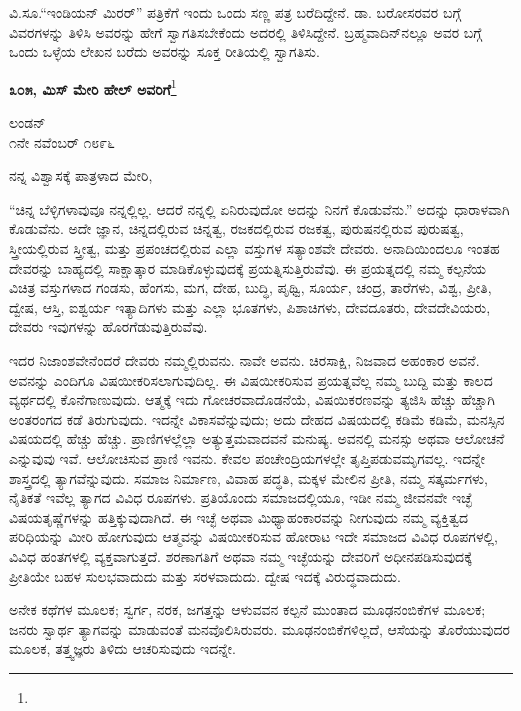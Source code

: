 ವಿ.ಸೂ.\enginline{-}“ಇಂಡಿಯನ್ ಮಿರರ್” ಪತ್ರಿಕೆಗೆ ಇಂದು ಒಂದು ಸಣ್ಣ ಪತ್ರ ಬರೆದಿದ್ದೇನೆ. ಡಾ. ಬರೋಸರವರ ಬಗ್ಗೆ ವಿವರಗಳನ್ನು ತಿಳಿಸಿ ಅವರನ್ನು ಹೇಗೆ ಸ್ವಾಗತಿಸಬೇಕೆಂದು ಅದರಲ್ಲಿ ತಿಳಿಸಿದ್ದೇನೆ. ಬ್ರಹ್ಮವಾದಿನ್‌ನಲ್ಲೂ ಅವರ ಬಗ್ಗೆ ಒಂದು ಒಳ್ಳೆಯ ಲೇಖನ ಬರೆದು ಅವರನ್ನು ಸೂಕ್ತ ರೀತಿಯಲ್ಲಿ ಸ್ವಾಗತಿಸು.

\begin{center}
\textbf{೩೦೫, ಮಿಸ್ ಮೇರಿ ಹೇಲ್‌ ಅವರಿಗೆ}\footnote{}
\end{center}

\begin{flushright}
ಲಂಡನ್\\೧ನೇ ನವೆಂಬರ್ ೧೮೯೬
\end{flushright}

\noindent
ನನ್ನ ವಿಶ್ವಾಸಕ್ಕೆ ಪಾತ್ರಳಾದ ಮೇರಿ,

“ಚಿನ್ನ ಬೆಳ್ಳಿಗಳಾವುವೂ ನನ್ನಲ್ಲಿಲ್ಲ. ಆದರೆ ನನ್ನಲ್ಲಿ ಏನಿರುವುದೋ ಅದನ್ನು ನಿನಗೆ ಕೊಡುವೆನು.” ಅದನ್ನು ಧಾರಾಳವಾಗಿ ಕೊಡುವೆನು. ಅದೇ ಜ್ಞಾನ, ಚಿನ್ನದಲ್ಲಿರುವ ಚಿನ್ನತ್ವ, ರಜಕದಲ್ಲಿರುವ ರಜಕತ್ವ, ಪುರುಷನಲ್ಲಿರುವ ಪುರುಷತ್ವ, ಸ್ತ್ರೀಯಲ್ಲಿರುವ ಸ್ತ್ರೀತ್ವ, ಮತ್ತು ಪ್ರಪಂಚದಲ್ಲಿರುವ ಎಲ್ಲಾ ವಸ್ತುಗಳ ಸತ್ಯಾಂಶವೇ ದೇವರು. ಅನಾದಿಯಿಂದಲೂ ಇಂತಹ ದೇವರನ್ನು ಬಾಹ್ಯದಲ್ಲಿ ಸಾಕ್ಷಾತ್ಕಾರ ಮಾಡಿಕೊಳ್ಳುವುದಕ್ಕೆ ಪ್ರಯತ್ನಿಸುತ್ತಿರುವೆವು. ಈ ಪ್ರಯತ್ನದಲ್ಲಿ ನಮ್ಮ ಕಲ್ಪನೆಯ ವಿಚಿತ್ರ ವಸ್ತುಗಳಾದ ಗಂಡಸು, ಹೆಂಗಸು, ಮಗ, ದೇಹ, ಬುದ್ಧಿ, ಪೃಥ್ವಿ, ಸೂರ್ಯ, ಚಂದ್ರ, ತಾರೆಗಳು, ವಿಶ್ವ, ಪ್ರೀತಿ, ದ್ವೇಷ, ಆಸ್ತಿ, ಐಶ್ವರ್ಯ ಇತ್ಯಾದಿಗಳು ಮತ್ತು ಎಲ್ಲಾ ಭೂತಗಳು, ಪಿಶಾಚಿಗಳು, ದೇವದೂತರು, ದೇವದೇವಿಯರು, ದೇವರು ಇವುಗಳನ್ನು ಹೊರಗೆಡುವುತ್ತಿರುವೆವು.

ಇದರ ನಿಜಾಂಶವೇನೆಂದರೆ ದೇವರು ನಮ್ಮಲ್ಲಿರುವನು. ನಾವೇ ಅವನು. ಚಿರಸಾಕ್ಷಿ, ನಿಜವಾದ ಅಹಂಕಾರ ಅವನೆ. ಅವನನ್ನು ಎಂದಿಗೂ ವಿಷಯೀಕರಿಸಲಾಗುವುದಿಲ್ಲ. ಈ ವಿಷಯೀಕರಿಸುವ ಪ್ರಯತ್ನವೆಲ್ಲ ನಮ್ಮ ಬುದ್ದಿ ಮತ್ತು ಕಾಲದ ವ್ಯರ್ಥದಲ್ಲಿ ಕೊನೆಗಾಣುವುದು. ಆತ್ಮಕ್ಕೆ ಇದು ಗೋಚರವಾದೊಡನೆಯೆ, ವಿಷಯಿಕರಣವನ್ನು ತ್ಯಜಿಸಿ ಹೆಚ್ಚು ಹೆಚ್ಚಾಗಿ ಅಂತರಂಗದ ಕಡೆ ತಿರುಗುವುದು. ಇದನ್ನೇ ವಿಕಾಸವೆನ್ನುವುದು; ಅದು ದೇಹದ ವಿಷಯದಲ್ಲಿ ಕಡಿಮೆ ಕಡಿಮೆ, ಮನಸ್ಸಿನ ವಿಷಯದಲ್ಲಿ ಹೆಚ್ಚು ಹೆಚ್ಚು. ಪ್ರಾಣಿಗಳಲ್ಲೆಲ್ಲಾ ಅತ್ಯುತ್ತಮವಾದವನೆ ಮನುಷ್ಯ. ಅವನಲ್ಲಿ ಮನಸ್ಸು ಅಥವಾ ಆಲೋಚನೆ ಎನ್ನುವುವು ಇವೆ. ಆಲೋಚಿಸುವ ಪ್ರಾಣಿ ಇವನು. ಕೇವಲ ಪಂಚೇಂದ್ರಿಯಗಳಲ್ಲೇ ತೃಪ್ತಿಪಡುವಮೃಗವಲ್ಲ. ಇದನ್ನೇ ಶಾಸ್ತ್ರದಲ್ಲಿ ತ್ಯಾಗವೆನ್ನುವುದು. ಸಮಾಜ ನಿರ್ಮಾಣ, ವಿವಾಹ ಪದ್ಧತಿ, ಮಕ್ಕಳ ಮೇಲಿನ ಪ್ರೀತಿ, ನಮ್ಮ ಸತ್ಕರ್ಮಗಳು, ನೈತಿಕತೆ \enginline{-} ಇವೆಲ್ಲ ತ್ಯಾಗದ ವಿವಿಧ ರೂಪಗಳು. ಪ್ರತಿಯೊಂದು ಸಮಾಜದಲ್ಲಿಯೂ, ಇಡೀ ನಮ್ಮ ಜೀವನವೇ ಇಚ್ಛೆ ವಿಷಯತೃಷ್ಣೆಗಳನ್ನು ಹತ್ತಿಕ್ಕುವುದಾಗಿದೆ. ಈ ಇಚ್ಛೆ ಅಥವಾ ಮಿಥ್ಯಾಹಂಕಾರವನ್ನು ನೀಗುವುದು\enginline{-} ನಮ್ಮ ವ್ಯಕ್ತಿತ್ವದ ಪರಿಧಿಯನ್ನು ಮೀರಿ ಹೋಗುವುದು\enginline{-} ಆತ್ಮವನ್ನು ವಿಷಯೀಕರಿಸುವ ಹೋರಾಟ \enginline{-} ಇದೇ ಸಮಾಜದ ವಿವಿಧ ರೂಪಗಳಲ್ಲಿ, ವಿವಿಧ ಹಂತಗಳಲ್ಲಿ ವ್ಯಕ್ತವಾಗುತ್ತದೆ. ಶರಣಾಗತಿಗೆ ಅಥವಾ ನಮ್ಮ ಇಚ್ಛೆಯನ್ನು ದೇವರಿಗೆ ಅಧೀನಪಡಿಸುವುದಕ್ಕೆ ಪ್ರೀತಿಯೇ ಬಹಳ ಸುಲಭವಾದುದು ಮತ್ತು ಸರಳವಾದುದು. ದ್ವೇಷ ಇದಕ್ಕೆ ವಿರುದ್ಧವಾದುದು.

ಅನೇಕ ಕಥೆಗಳ ಮೂಲಕ; ಸ್ವರ್ಗ, ನರಕ, ಜಗತ್ತನ್ನು ಆಳುವವನ ಕಲ್ಪನೆ ಮುಂತಾದ ಮೂಢನಂಬಿಕೆಗಳ ಮೂಲಕ; ಜನರು ಸ್ವಾರ್ಥ ತ್ಯಾಗವನ್ನು ಮಾಡುವಂತೆ ಮನವೊಲಿಸಿರುವರು. ಮೂಢನಂಬಿಕೆಗಳಿಲ್ಲದೆ, ಆಸೆಯನ್ನು ತೊರೆಯುವುದರ ಮೂಲಕ, ತತ್ತ್ವಜ್ಞರು ತಿಳಿದು ಆಚರಿಸುವುದು ಇದನ್ನೇ.

